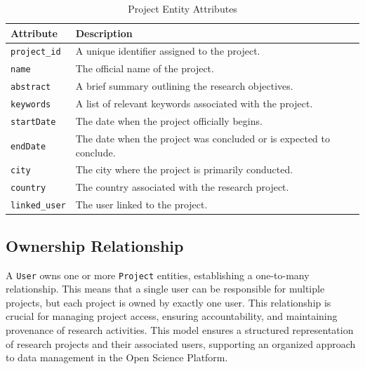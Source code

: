 \documentclass{article}
\begin{document}
\begin{table}[h]
      \centering
      \renewcommand{\arraystretch}{1.2}
      \caption{Project Entity Attributes}
      \label{tab:project_entity}
      \begin{tabularx}{\textwidth}{|l|X|}
            \hline
            \textbf{Attribute}    & \textbf{Description}                                                \\ \hline
            \texttt{project\_id}  & A unique identifier assigned to the project.                        \\ \hline
            \texttt{name}         & The official name of the project.                                   \\ \hline
            \texttt{abstract}     & A brief summary outlining the research objectives.                  \\ \hline
            \texttt{keywords}     & A list of relevant keywords associated with the project.            \\ \hline
            \texttt{startDate}    & The date when the project officially begins.                        \\ \hline
            \texttt{endDate}      & The date when the project was concluded or is expected to conclude. \\ \hline
            \texttt{city}         & The city where the project is primarily conducted.                  \\ \hline
            \texttt{country}      & The country associated with the research project.                   \\ \hline
            \texttt{linked\_user} & The user linked to the project.                                     \\ \hline
      \end{tabularx}
\end{table}


\subsection{Ownership Relationship}
A \texttt{User} owns one or more \texttt{Project} entities, establishing a one-to-many relationship. This means that a single user can be responsible for multiple projects, but each project is owned by exactly one user. This relationship is crucial for managing project access, ensuring accountability, and maintaining provenance of research activities. This model ensures a structured representation of research projects and their associated users, supporting an organized approach to data management in the Open Science Platform.
\end{document}
